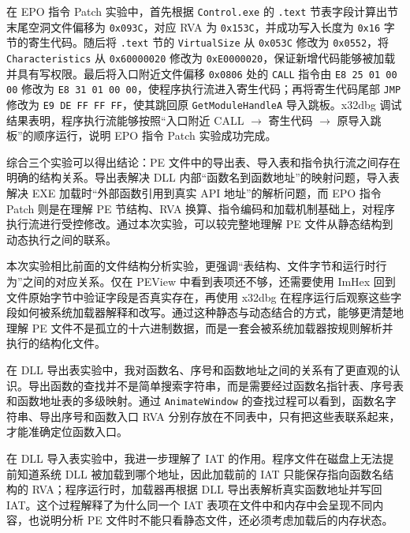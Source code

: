﻿\documentclass[12pt]{ctexart}
\begin{document}
在 EPO 指令 Patch 实验中，首先根据 \texttt{Control.exe} 的 \texttt{.text} 节表字段计算出节末尾空洞文件偏移为 \texttt{0x093C}，对应 RVA 为 \texttt{0x153C}，并成功写入长度为 \texttt{0x16} 字节的寄生代码。随后将 \texttt{.text} 节的 \texttt{VirtualSize} 从 \texttt{0x053C} 修改为 \texttt{0x0552}，将 \texttt{Characteristics} 从 \texttt{0x60000020} 修改为 \texttt{0xE0000020}，保证新增代码能够被加载并具有写权限。最后将入口附近文件偏移 \texttt{0x0806} 处的 \texttt{CALL} 指令由 \texttt{E8 25 01 00 00} 修改为 \texttt{E8 31 01 00 00}，使程序执行流进入寄生代码；再将寄生代码尾部 \texttt{JMP} 修改为 \texttt{E9 DE FF FF FF}，使其跳回原 \texttt{GetModuleHandleA} 导入跳板。x32dbg 调试结果表明，程序执行流能够按照“入口附近 CALL \(\rightarrow\) 寄生代码 \(\rightarrow\) 原导入跳板”的顺序运行，说明 EPO 指令 Patch 实验成功完成。

综合三个实验可以得出结论：PE 文件中的导出表、导入表和指令执行流之间存在明确的结构关系。导出表解决 DLL 内部“函数名到函数地址”的映射问题，导入表解决 EXE 加载时“外部函数引用到真实 API 地址”的解析问题，而 EPO 指令 Patch 则是在理解 PE 节结构、RVA 换算、指令编码和加载机制基础上，对程序执行流进行受控修改。通过本次实验，可以较完整地理解 PE 文件从静态结构到动态执行之间的联系。

\vspace{1.2cm}


本次实验相比前面的文件结构分析实验，更强调“表结构、文件字节和运行时行为”之间的对应关系。仅在 PEView 中看到表项还不够，还需要使用 ImHex 回到文件原始字节中验证字段是否真实存在，再使用 x32dbg 在程序运行后观察这些字段如何被系统加载器解释和改写。通过这种静态与动态结合的方式，能够更清楚地理解 PE 文件不是孤立的十六进制数据，而是一套会被系统加载器按规则解析并执行的结构化文件。

在 DLL 导出表实验中，我对函数名、序号和函数地址之间的关系有了更直观的认识。导出函数的查找并不是简单搜索字符串，而是需要经过函数名指针表、序号表和函数地址表的多级映射。通过 \texttt{AnimateWindow} 的查找过程可以看到，函数名字符串、导出序号和函数入口 RVA 分别存放在不同表中，只有把这些表联系起来，才能准确定位函数入口。

在 DLL 导入表实验中，我进一步理解了 IAT 的作用。程序文件在磁盘上无法提前知道系统 DLL 被加载到哪个地址，因此加载前的 IAT 只能保存指向函数名结构的 RVA；程序运行时，加载器再根据 DLL 导出表解析真实函数地址并写回 IAT。这个过程解释了为什么同一个 IAT 表项在文件中和内存中会呈现不同内容，也说明分析 PE 文件时不能只看静态文件，还必须考虑加载后的内存状态。
\end{document}
